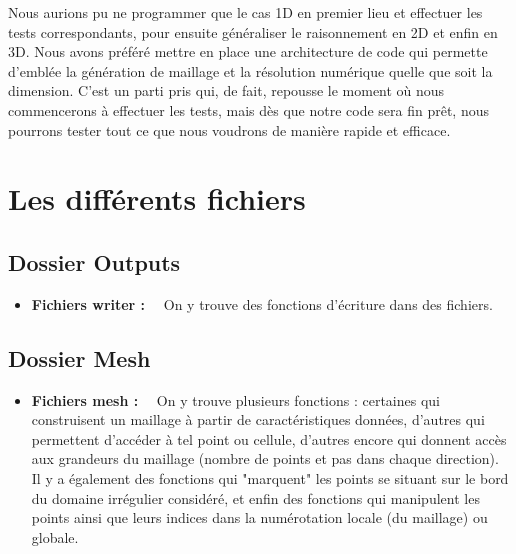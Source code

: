 \documentclass[12pt]{article}
\begin{document}
\vspace{5 mm}

\noindent
Nous aurions pu ne programmer que le cas 1D en premier lieu et effectuer les tests correspondants, pour ensuite généraliser le raisonnement en 2D et enfin en 3D. Nous avons préféré mettre en place une architecture de code qui permette d'emblée la génération de maillage et la résolution numérique quelle que soit la dimension. C'est un parti pris qui, de fait, repousse le moment où nous commencerons à effectuer les tests, mais dès que notre code sera fin prêt, nous pourrons tester tout ce que nous voudrons de manière rapide et efficace.

\vspace{5 mm}

\section{Les différents fichiers}

\subsection{Dossier Outputs}

\noindent
\begin{itemize}
	\item \textbf{Fichiers writer :}~~ On y trouve des fonctions d'écriture dans des fichiers.
\end{itemize}

\vspace{2 mm}

\subsection{Dossier Mesh}

\noindent
\begin{itemize}
	\item \textbf{Fichiers mesh :}~~ On y trouve plusieurs fonctions : certaines qui construisent un maillage à partir de caractéristiques données, d'autres qui permettent d'accéder à tel point ou cellule, d'autres encore qui donnent accès aux grandeurs du maillage (nombre de points et pas dans chaque direction). Il y a également des fonctions qui "marquent" les points se situant sur le bord du domaine irrégulier considéré, et enfin des fonctions qui manipulent les points ainsi que leurs indices dans la numérotation locale (du maillage) ou globale.
\end{itemize}
\end{document}
